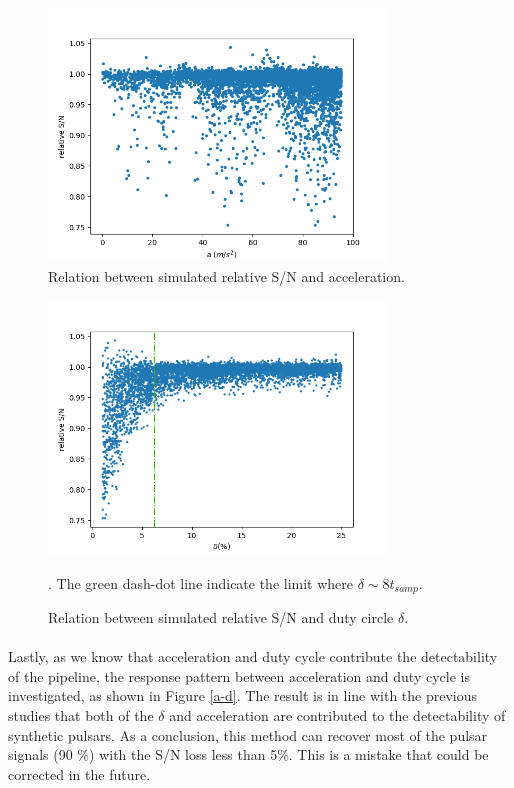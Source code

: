 \documentclass[thesis_msc.tex]{subfiles}
\begin{document}
\begin{figure}[h!]
\centering
\includegraphics[width=0.80\textwidth]{figures/A}
\caption{Relation between simulated relative S/N and acceleration.  }\label{a_twice}
\end{figure}

\begin{figure}[h!]
\centering
\includegraphics[width=0.80\textwidth]{figures/duty_twice}
\caption{Relation between simulated relative S/N and duty circle $\delta$.}\label{duty_twice}. The green dash-dot line indicate the limit where $\delta \sim 8t_{samp}$.
\end{figure}

\paragraph{} Lastly, as we know that acceleration and duty cycle contribute the detectability of the pipeline, the response pattern between acceleration and duty cycle is investigated, as shown in Figure \ref{a-d}. The result is in line with the previous studies that both of the $\delta$ and acceleration are contributed to the detectability of synthetic pulsars. %
As a conclusion, this method can recover most of the pulsar signals (90 \%) with the S/N loss less than 5\%. This is a mistake that could be corrected in the future. 
\end{document}
